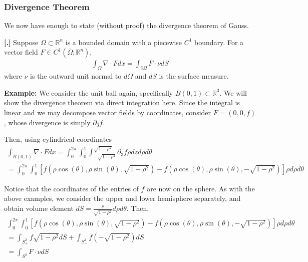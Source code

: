 \documentclass{article}
\newcommand{\R}{{\mathbb{R}}}
\newcommand{\cl}[1]{{\overline{#1}}}
\newcommand{\pd}{\partial}
\newcounter{result}[section]
\newenvironment{res}[1][]{\refstepcounter{result}\par\medskip
	\noindent \textbf{[\thesection.\theresult] #1} \rmfamily}{\medskip}
\begin{document}
	
	
	
	
	
	\subsubsection{Divergence Theorem}
	
	We now have enough to state (without proof) the divergence theorem of Gauss. 
	
	\begin{res}
		Suppose $\Omega \subset \R^{n}$ is a bounded domain with a piecewise $C^{1}$ boundary. For a vector field $F \in C^{1}(\cl{\Omega};\R^{n})$, 
		\begin{align*}
			\int_{\Omega} \nabla \cdot F dx = \int_{\pd \Omega} F \cdot \nu dS
		\end{align*}
		where $\nu$ is the outward unit normal to $d\Omega$ and $dS$ is the surface measure. 
	\end{res}
	
	
	\vspace{0.25cm}
	
	\textbf{Example:} We consider the unit ball again, specifically $B(0,1) \subset \R^{3}$. We will show the divergence theorem via direct integration here. Since the integral is linear and we may decompose vector fields by coordinates, consider $F = (0,0,f)$, whose divergence is simply $\pd_{3}f$. 
	
	Then, using cylindrical coordinates
	\begin{align*}
		\int_{B(0,1)} \nabla \cdot F dx = \int_{0}^{2\pi} \int_{0}^{1} \int_{-\sqrt{1-\rho^{2}}}^{\sqrt{1-\rho^{2}}} \pd_{3} f \rho dz d\rho d\theta \\
				= \int_{0}^{2\pi} \int_{0}^{1} [f(\rho \cos(\theta), \rho \sin(\theta), \sqrt{1-\rho^{2}}) - f(\rho \cos(\theta), \rho \sin(\theta), -\sqrt{1-\rho^{2}}) ]\rho d\rho d\theta
	\end{align*}
	
	Notice that the coordinates of the entries of $f$ are now on the sphere. As with the above examples, we consider the upper and lower hemisphere separately, and obtain volume element $dS = \frac{\rho}{\sqrt{1-\rho^{2}}} d\rho d\theta$. Then,
	\begin{align*}
		\int_{0}^{2\pi} \int_{0}^{1} [f(\rho \cos(\theta), \rho \sin(\theta), \sqrt{1-\rho^{2}}) - f(\rho \cos(\theta), \rho \sin(\theta), -\sqrt{1-\rho^{2}}) ]\rho d\rho d\theta \\
		= \int_{S^{2}_{+}} f\sqrt{1-\rho^{2}} dS + \int_{S^{2}_{-}} f(-\sqrt{1-\rho^{2}})dS \\
		= \int_{S^{2}} F \cdot \nu dS
	\end{align*}
	
\end{document}
